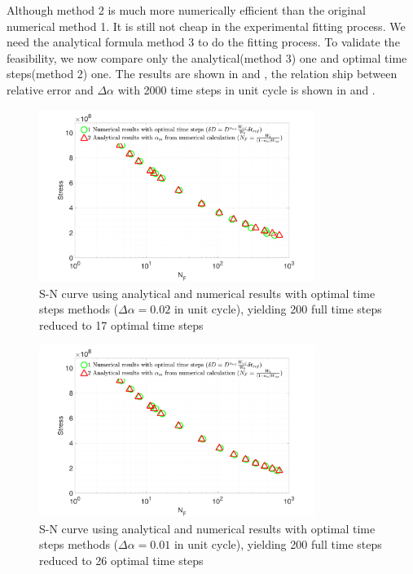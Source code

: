 Although method 2 is much more numerically efficient than the original numerical method 1. It is still not cheap in the experimental fitting process. We need the analytical formula method 3 to do the fitting process. To validate the feasibility, we now compare only the analytical(method 3) one and optimal time steps(method 2) one. The results are shown in  and , the relation ship between relative error and $\Delta \alpha$ with 2000 time steps in unit cycle is shown in   and .
\begin{figure}[!h]
	\centering
	\includegraphics[width=0.8\textwidth]{figures//SN_opt_ana_200_delta_alp=0.02.png} 
	\caption{S-N curve using analytical and numerical results with optimal time steps methods ($\Delta \alpha=0.02$ in unit cycle), yielding 200 full time steps reduced to 17 optimal time steps}
	\label{fig.SNnumerical2methods}
\end{figure}
\begin{figure}[!h]
	\centering
	\includegraphics[width=0.8\textwidth]{figures//SN_opt_ana_200_delta_alp=0.01.png} 
	\caption{S-N curve using analytical and numerical results with optimal time steps methods ($\Delta \alpha=0.01$ in unit cycle), yielding 200 full time steps reduced to 26  optimal time steps}
	\label{fig.SNnumerical2methods2}
\end{figure}
